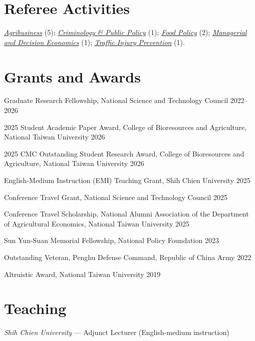 \documentclass[11pt,letterpaper]{article}
\begin{document}
\section{Referee Activities}\label{referee-activities}

\href{https://onlinelibrary.wiley.com/journal/15206297}{\emph{Agribusiness}}
(5);
\href{https://onlinelibrary.wiley.com/journal/17459133}{\emph{Criminology
\& Public Policy}} (1);
\href{https://www.sciencedirect.com/journal/food-policy}{\emph{Food
Policy}} (2);
\href{https://onlinelibrary.wiley.com/journal/10991468}{\emph{Managerial
and Decision Economics}} (1);
\href{https://www.tandfonline.com/journals/gcpi20}{\emph{Traffic Injury
Prevention}} (1).

\section{Grants and Awards}\label{grants-and-awards}

Graduate Research Fellowship, National Science and Technology Council
\hfill \mbox{2022--2026}

2025 Student Academic Paper Award, College of Bioresources and
Agriculture, National Taiwan University \hfill \mbox{2026}

2025 CMC Outstanding Student Research Award, College of Bioresources and
Agriculture, National Taiwan University \hfill \mbox{2026}

English-Medium Instruction (EMI) Teaching Grant, Shih Chien University
\hfill \mbox{2025}

Conference Travel Grant, National Science and Technology Council
\hfill \mbox{2025}

Conference Travel Scholarship, National Alumni Association of the
Department of Agricultural Economics, National Taiwan University
\hfill \mbox{2025}

Sun Yun-Suan Memorial Fellowship, National Policy Foundation
\hfill \mbox{2023}

Outstanding Veteran, Penghu Defense Command, Republic of China Army
\hfill \mbox{2022}

Altruistic Award, National Taiwan University \hfill \mbox{2019}

\section{Teaching}\label{teaching}

\emph{Shih Chien University} --- Adjunct Lecturer (English-medium
instruction)
\end{document}
